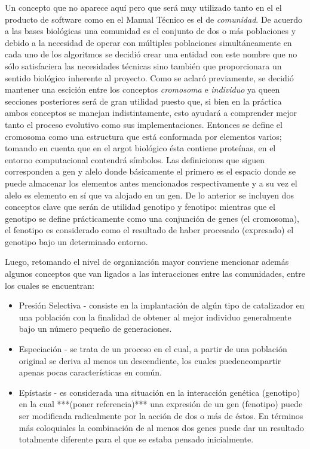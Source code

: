 \documentclass[class=report, crop=false]{standalone}
\begin{document}
Un concepto que no aparece aquí pero que será muy utilizado 
tanto en el el producto de software como en el Manual Técnico 
es el de \textit{comunidad}. De acuerdo a las bases biológicas 
\cite{b3} una comunidad es el conjunto de dos o más poblaciones 
y debido a la necesidad de operar con múltiples poblaciones 
simultáneamente en cada uno de los algoritmos se decidió crear 
una entidad con este nombre que no sólo satisfaciera las necesidades 
técnicas sino también que proporcionara un sentido biológico 
inherente al proyecto.\break
Como se aclaró previamente, se decidió mantener una escición
entre los conceptos \textit{cromosoma} e \textit{individuo} 
ya queen secciones posteriores será de gran utilidad puesto que, 
si bien en la práctica ambos conceptos se manejan indistintamente, 
esto ayudará a comprender mejor tanto el proceso evolutivo como 
sus implementaciones.\medskip\break
Entonces se define el cromosoma como una estructura que está 
conformada por elementos varios; tomando en cuenta que en el 
argot biológico ésta contiene proteínas, en el entorno computacional 
contendrá símbolos. Las definiciones que siguen corresponden 
a gen y alelo donde básicamente el primero es el espacio donde 
se puede almacenar los elementos antes mencionados respectivamente 
y a su vez el alelo es elemento en sí que va alojado en un gen.\medskip\break  
De lo anterior se incluyen dos conceptos clave que serán de utilidad 
genotipo y fenotipo: mientras que el genotipo se define prácticamente 
como una conjunción de genes (el cromosoma), el fenotipo es considerado 
como el resultado de haber procesado (expresado) el genotipo bajo un 
determinado entorno.

Luego, retomando el nivel de organización mayor conviene 
mencionar además algunos conceptos que van ligados a las 
interacciones entre las comunidades, entre los cuales se encuentran:

\begin{itemize}
\item Presión Selectiva - consiste en la implantación de algún 
tipo de catalizador en una población con la finalidad de obtener al 
mejor individuo generalmente bajo un número pequeño de generaciones. 
\item Especiación - se trata de un proceso en el cual, a partir de 
una población original se deriva al menos un descendiente, los cuales 
puedencompartir apenas pocas características en común. 
\item Epístasis - es considerada una situación en la interacción 
genética (genotipo) en la cual ***(poner referencia)*** una expresión 
de un gen (fenotipo) puede ser modificada radicalmente por la acción 
de dos o más de éstos. En términos más coloquiales la combinación de 
al menos dos genes puede dar un resultado totalmente diferente para 
el que se estaba pensado inicialmente. 
\end{itemize}
\end{document}
